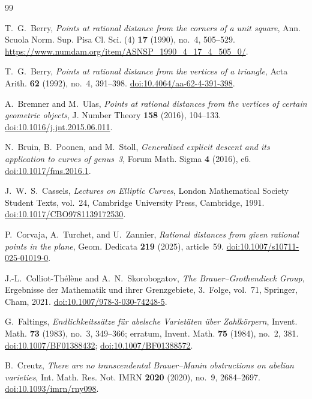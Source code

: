 \begin{thebibliography}{99}

T.~G.~Berry,
\emph{Points at rational distance from the corners of a unit square},
Ann. Scuola Norm. Sup. Pisa Cl. Sci. (4) \textbf{17} (1990), no.~4, 505--529.
\url{https://www.numdam.org/item/ASNSP_1990_4_17_4_505_0/}.

T.~G.~Berry,
\emph{Points at rational distance from the vertices of a triangle},
Acta Arith. \textbf{62} (1992), no.~4, 391--398.
\href{https://doi.org/10.4064/aa-62-4-391-398}{doi:10.4064/aa-62-4-391-398}.

A.~Bremner and M.~Ulas,
\emph{Points at rational distances from the vertices of certain geometric objects},
J. Number Theory \textbf{158} (2016), 104--133.
\href{https://doi.org/10.1016/j.jnt.2015.06.011}{doi:10.1016/j.jnt.2015.06.011}.

N.~Bruin, B.~Poonen, and M.~Stoll,
\emph{Generalized explicit descent and its application to curves of genus~3},
Forum Math. Sigma \textbf{4} (2016), e6.
\href{https://doi.org/10.1017/fms.2016.1}{doi:10.1017/fms.2016.1}.

J.~W.~S.~Cassels,
\emph{Lectures on Elliptic Curves},
London Mathematical Society Student Texts, vol.~24,
Cambridge University Press, Cambridge, 1991.
\href{https://doi.org/10.1017/CBO9781139172530}{doi:10.1017/CBO9781139172530}.

P.~Corvaja, A.~Turchet, and U.~Zannier,
\emph{Rational distances from given rational points in the plane},
Geom. Dedicata \textbf{219} (2025), article~59.
\href{https://doi.org/10.1007/s10711-025-01019-0}{doi:10.1007/s10711-025-01019-0}.

J.-L.~Colliot-Th\'el\`ene and A.~N.~Skorobogatov,
\emph{The Brauer--Grothendieck Group},
Ergebnisse der Mathematik und ihrer Grenzgebiete, 3.~Folge, vol.~71,
Springer, Cham, 2021.
\href{https://doi.org/10.1007/978-3-030-74248-5}{doi:10.1007/978-3-030-74248-5}.

G.~Faltings,
\emph{Endlichkeitss\"atze f\"ur abelsche Variet\"aten \"uber Zahlk\"orpern},
Invent. Math. \textbf{73} (1983), no.~3, 349--366;
erratum, Invent. Math. \textbf{75} (1984), no.~2, 381.
\href{https://doi.org/10.1007/BF01388432}{doi:10.1007/BF01388432};
\href{https://doi.org/10.1007/BF01388572}{doi:10.1007/BF01388572}.

B.~Creutz,
\emph{There are no transcendental Brauer--Manin obstructions on abelian varieties},
Int. Math. Res. Not. IMRN \textbf{2020} (2020), no.~9, 2684--2697.
\href{https://doi.org/10.1093/imrn/rny098}{doi:10.1093/imrn/rny098}.


\end{thebibliography}
